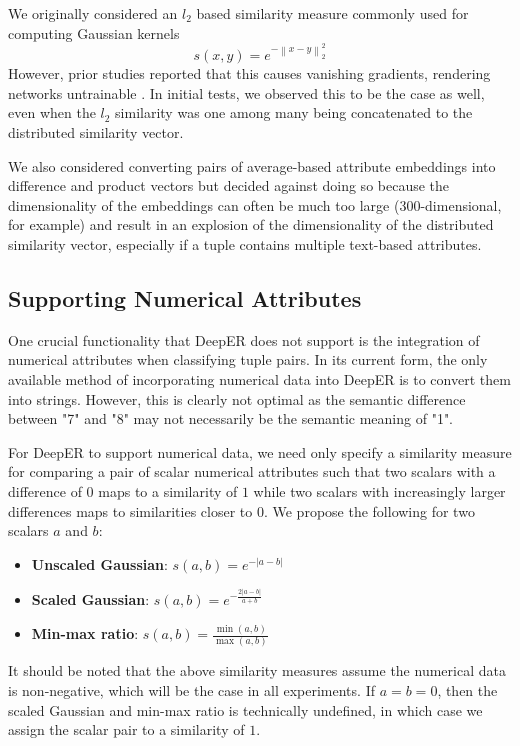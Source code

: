 \documentclass{proc}
\begin{document}
We originally considered an $l_2$ based similarity measure commonly used for computing Gaussian kernels $$s(x, y) = e^{-\left\|x - y\right\|_2^2}$$ However, prior studies reported that this causes vanishing gradients, rendering networks untrainable \cite{chopra-learning}. In initial tests, we observed this to be the case as well, even when the $l_2$ similarity was one among many being concatenated to the distributed similarity vector.

We also considered converting pairs of average-based attribute embeddings into difference and product vectors but decided against doing so because the dimensionality of the embeddings can often be much too large (300-dimensional, for example) and result in an explosion of the dimensionality of the distributed similarity vector, especially if a tuple contains multiple text-based attributes.

\subsection{Supporting Numerical Attributes}

One crucial functionality that DeepER does not support is the integration of numerical attributes when classifying tuple pairs. In its current form, the only available method of incorporating numerical data into DeepER is to convert them into strings. However, this is clearly not optimal as the semantic difference between "7" and "8" may not necessarily be the semantic meaning of "1".

For DeepER to support numerical data, we need only specify a similarity measure for comparing a pair of scalar numerical attributes such that two scalars with a difference of $0$ maps to a similarity of $1$ while two scalars with increasingly larger differences maps to similarities closer to $0$. We propose the following for two scalars $a$ and $b$:
\begin{itemize}
\item{\textbf{Unscaled Gaussian}:  $s(a, b) = e^{-|a-b|}$}
\item{\textbf{Scaled Gaussian}:  $s(a, b) = e^{-\frac{2|a-b|}{a+b}}$}
\item{\textbf{Min-max ratio}:  $s(a, b) = \frac{\min(a,b)}{\max(a,b)}$}
\end{itemize}
It should be noted that the above similarity measures assume the numerical data is non-negative, which will be the case in all experiments. If $a = b = 0$, then the scaled Gaussian and min-max ratio is technically undefined, in which case we assign the scalar pair to a similarity of $1$.
\end{document}
